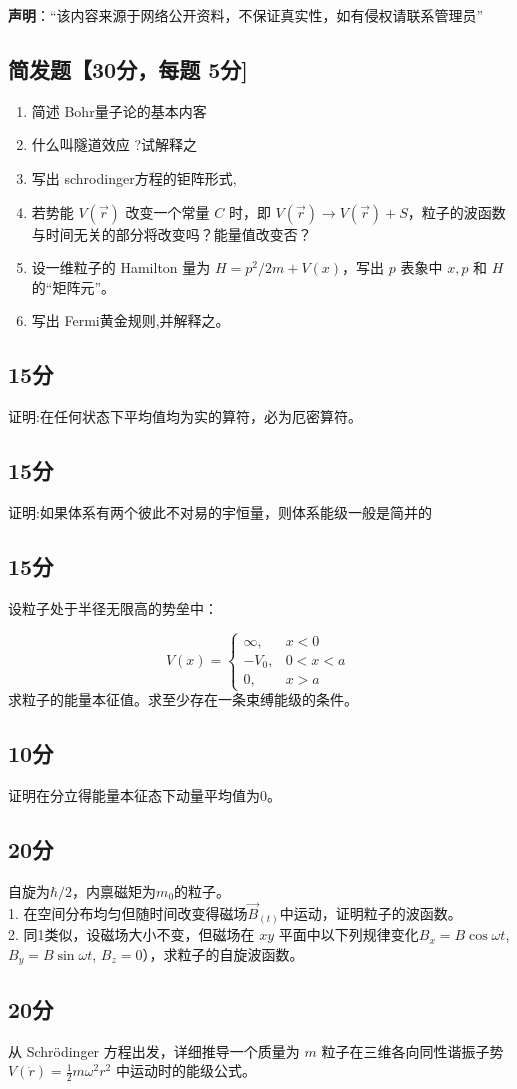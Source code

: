 
\textbf{声明}：“该内容来源于网络公开资料，不保证真实性，如有侵权请联系管理员”

\subsection{简发题【30分，每题 5分]}
\begin{enumerate}
\item 简述 Bohr量子论的基本内客
\item 什么叫隧道效应 ?试解释之
\item 写出 schrodinger方程的钜阵形式,
\item 若势能 $V(\vec{r})$ 改变一个常量 $C$ 时，即 $V(\vec{r}) \rightarrow V(\vec{r}) + S$，粒子的波函数与时间无关的部分将改变吗？能量值改变否？
\item 设一维粒子的 Hamilton 量为 $H = p^2/2m + V(x)$，写出 $p$ 表象中 $x, p$ 和 $H$ 的“矩阵元”。
\item 写出 Fermi黄金规则,并解释之。
\end{enumerate}
\subsection{15分}
证明:在任何状态下平均值均为实的算符，必为厄密算符。
\subsection{15分}
证明:如果体系有两个彼此不对易的宇恒量，则体系能级一般是简并的
\subsection{15分}
设粒子处于半径无限高的势垒中：

\[
V(x) =
\begin{cases}
\infty, & x < 0 \\
-V_0, & 0 < x < a \\
0, & x > a
\end{cases}~
\]
求粒子的能量本征值。求至少存在一条束缚能级的条件。
\subsection{10分}
证明在分立得能量本征态下动量平均值为0。
\subsection{20分}
自旋为$\hbar/2$，内禀磁矩为$m_0$的粒子。\\
1. 在空间分布均匀但随时间改变得磁场$\vec{B}_(t)$中运动，证明粒子的波函数。\\
2. 同1类似，设磁场大小不变，但磁场在 $x y $ 平面中以下列规律变化$B_x = B \cos \omega t$, $B_y = B \sin \omega t$, $B_z = 0$），求粒子的自旋波函数。
\subsection{20分}
 从 Schrödinger 方程出发，详细推导一个质量为 $m$ 粒子在三维各向同性谐振子势 $V(\dot{r}) = \frac{1}{2} m \omega^2 r^2$ 中运动时的能级公式。